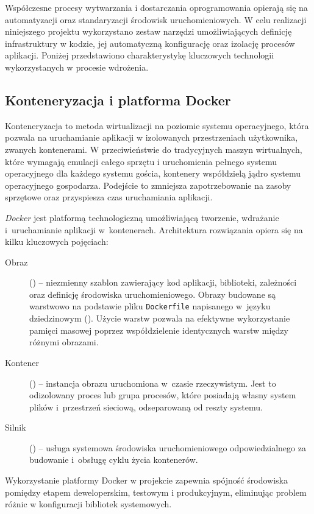 Współczesne procesy wytwarzania i dostarczania oprogramowania opierają się na automatyzacji oraz standaryzacji środowisk uruchomieniowych. W celu realizacji niniejszego projektu wykorzystano zestaw narzędzi umożliwiających definicję infrastruktury w kodzie, jej automatyczną konfigurację oraz izolację procesów aplikacji. Poniżej przedstawiono charakterystykę kluczowych technologii wykorzystanych w procesie wdrożenia.

\subsection{Konteneryzacja i platforma Docker}

Konteneryzacja to metoda wirtualizacji na poziomie systemu operacyjnego, która pozwala na uruchamianie aplikacji w izolowanych przestrzeniach użytkownika, zwanych kontenerami. W przeciwieństwie do tradycyjnych maszyn wirtualnych, które wymagają emulacji całego sprzętu i uruchomienia pełnego systemu operacyjnego dla każdego systemu gościa, kontenery współdzielą jądro systemu operacyjnego gospodarza. Podejście to zmniejsza zapotrzebowanie na zasoby sprzętowe oraz przyspiesza czas uruchamiania aplikacji.

\textit{Docker} \cite{docker} jest platformą technologiczną umożliwiającą tworzenie, wdrażanie i~uruchamianie aplikacji w~kontenerach. Architektura rozwiązania opiera się na kilku kluczowych pojęciach:

\begin{description}
	\item[Obraz] () -- niezmienny szablon zawierający kod aplikacji, biblioteki, zależności oraz definicję środowiska uruchomieniowego. Obrazy budowane są warstwowo na podstawie pliku \texttt{Dockerfile} napisanego w~języku dziedzinowym (). Użycie warstw pozwala na efektywne wykorzystanie pamięci masowej poprzez współdzielenie identycznych warstw między różnymi obrazami.
	\item[Kontener] () -- instancja obrazu uruchomiona w~czasie rzeczywistym. Jest to odizolowany proces lub grupa procesów, które posiadają własny system plików i~przestrzeń sieciową, odseparowaną od reszty systemu.
	\item[Silnik] () -- usługa systemowa środowiska uruchomieniowego odpowiedzialnego za budowanie i~obsługę cyklu życia kontenerów.
\end{description}

Wykorzystanie platformy Docker w projekcie zapewnia spójność środowiska pomiędzy etapem deweloperskim, testowym i produkcyjnym, eliminując problem różnic w konfiguracji bibliotek systemowych.

